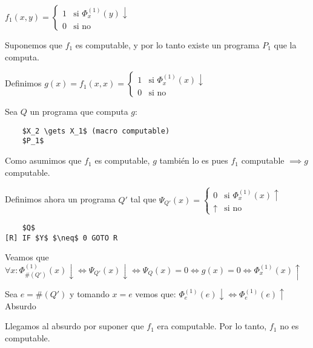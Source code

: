 $f_1(x, y) = \begin{cases}
    1 & \text{si } \Phi_x^{(1)}(y) \downarrow \\
    0 & \text{si no}
\end{cases}$

Suponemos que $f_1$ es computable, y por lo tanto existe un programa $P_1$ que la computa.

Definimos $g(x) = f_1(x, x) = \begin{cases}
    1 & \text{si } \Phi_x^{(1)}(x) \downarrow \\
    0 & \text{si no}
\end{cases}$

Sea $Q$ un programa que computa $g$:

\begin{lstlisting}
    $X_2 \gets X_1$ (macro computable)
    $P_1$
\end{lstlisting}

Como asumimos que $f_1$ es computable, $g$ también lo es pues $f_1$ computable $\implies g$ computable.

Definimos ahora un programa $Q'$ tal que $\Psi_{Q'}(x) = \begin{cases}
    0 & \text{si } \Phi_x^{(1)}(x) \uparrow \\
    \uparrow & \text{si no}
\end{cases}$

\begin{lstlisting}
    $Q$
[R] IF $Y$ $\neq$ 0 GOTO R
\end{lstlisting}

Veamos que $\forall x: \Phi_{\#(Q')}^{(1)}(x) \downarrow \iff \Psi_{Q'}(x) \downarrow \iff \Psi_Q(x) = 0 \iff g(x) = 0 \iff \Phi_x^{(1)}(x) \uparrow$

Sea $e = \#(Q')$ y tomando $x = e$ vemos que: $\Phi_e^{(1)}(e) \downarrow \iff \Phi_e^{(1)}(e) \uparrow$ Absurdo

Llegamos al absurdo por suponer que $f_1$ era computable. Por lo tanto, $f_1$ no es computable.
